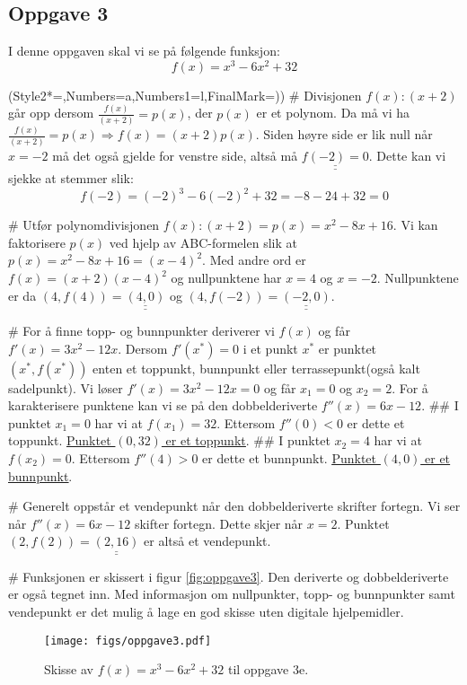 \documentclass[12pt, a4paper]
{article}						%
\def\answer#1{\underline{\underline{#1}}}
\begin{document}
	\subsection*{Oppgave 3}
	I denne oppgaven skal vi se på følgende funksjon:
	\begin{equation*}
	f(x) = x^3 - 6x^2 + 32
	\end{equation*}
	\begin{easylist}[enumerate]
		\ListProperties(Style2*=,Numbers=a,Numbers1=l,FinalMark={)})
		# Divisjonen $f(x) : (x+2)$ går opp dersom $\frac{f(x)}{(x+2)} = p(x)$, der $p(x)$ er et polynom. Da må vi ha $\frac{f(x)}{(x+2)} = p(x) \Rightarrow f(x) = (x+2) p(x)$. Siden høyre side er lik null når $x = -2$ må det også gjelde for venstre side, altså må $\answer{f(-2) = 0}$. Dette kan vi sjekke at stemmer slik:
		\begin{equation*}
		f(-2) = (-2)^3 - 6(-2)^2 + 32 = -8 -24 +32 = 0
		\end{equation*}
		
		# Utfør polynomdivisjonen $f(x):(x+2) = p(x) = x^2 - 8x + 16$. Vi kan faktorisere $p(x)$ ved hjelp av ABC-formelen slik at $p(x) = x^2 - 8x + 16 =  (x-4)^2$. Med andre ord er $f(x) = (x+2)(x-4)^2$ og nullpunktene har $x = 4$ og $x = -2$. Nullpunktene er da $(4, f(4)) = \answer{(4, 0)}$ og  $(4, f(-2)) = \answer{(-2, 0)}$.
		
		# For å finne topp- og bunnpunkter deriverer vi $f(x)$ og får $f'(x) = 3x^2 - 12x$.
		Dersom $f'(x^*) = 0$ i et punkt $x^*$ er punktet $\left(x^*, f\left(x^*\right)\right)$ enten et toppunkt, bunnpunkt eller terrassepunkt(også kalt sadelpunkt). 
		Vi løser $f'(x) = 3x^2 - 12x = 0$ og får $x_1 = 0$ og $x_2 = 2$. For å karakterisere punktene kan vi se på den dobbelderiverte $f''(x) = 6x - 12$.
		## I punktet $x_1 = 0$ har vi at $f(x_1) = 32$. Ettersom $f''(0) < 0$ er dette et toppunkt. \answer{Punktet $(0, 32)$ er et toppunkt}.
		## I punktet $x_2 = 4$ har vi at $f(x_2) = 0$. Ettersom $f''(4) > 0$ er dette et bunnpunkt. \answer{Punktet $(4, 0)$ er et bunnpunkt}.
		
		# Generelt oppstår et vendepunkt når den dobbelderiverte skrifter fortegn. 
		Vi ser når $f''(x) = 6x - 12$ skifter fortegn. Dette skjer når $x = 2$. Punktet $\left(2, f(2)\right) = \answer{\left(2, 16\right)}$ er altså et vendepunkt.
		
		# Funksjonen er skissert i figur \eqref{fig:oppgave3}. 
		Den deriverte og dobbelderiverte er også tegnet inn.
		Med informasjon om nullpunkter, topp- og bunnpunkter samt vendepunkt er det mulig å lage en god skisse uten digitale hjelpemidler.
		
		\begin{figure}[th!]
			\centering
			\texttt{[image: figs/oppgave3.pdf]}
			\caption{Skisse av $f(x) = x^3 - 6x^2 + 32$ til oppgave 3e.}
			\label{fig:oppgave3}
		\end{figure}
	\end{easylist}
	
\end{document}

